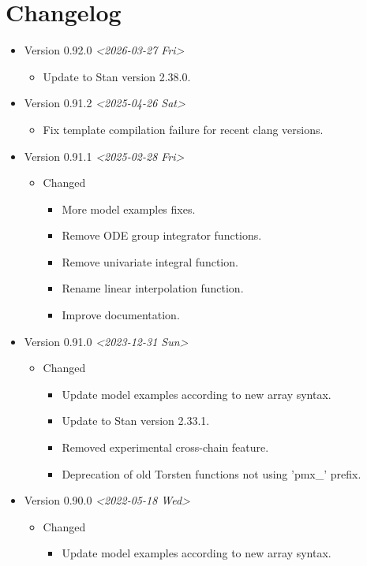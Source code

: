 \documentclass[12pt, reqno, oneside]{amsbook}
\numberwithin{equation}{chapter}
\numberwithin{figure}{chapter}
\numberwithin{table}{chapter}
\theoremstyle{remark}
\begin{document}
\chapter{Changelog}
\label{sec:org6ee814c}
\begin{itemize}
  \item Version 0.92.0 \textit{<2026-03-27 Fri>}
\begin{itemize}
\item Update to Stan version 2.38.0.
\end{itemize}
  \item Version 0.91.2 \textit{<2025-04-26 Sat>}
\begin{itemize}
\item Fix template compilation failure for recent clang versions.
\end{itemize}
  \item Version 0.91.1 \textit{<2025-02-28 Fri>}
\begin{itemize}
\item Changed
\begin{itemize}
\item More model examples fixes.
\item Remove ODE group integrator functions.
\item Remove univariate integral function.
\item Rename linear interpolation function.
\item Improve documentation.
\end{itemize}
\end{itemize}
\item Version 0.91.0 \textit{<2023-12-31 Sun>}
\begin{itemize}
\item Changed
\begin{itemize}
\item Update model examples according to new array syntax.
\item Update to Stan version 2.33.1.
\item Removed experimental cross-chain feature.
\item Deprecation of old Torsten functions not using 'pmx\_' prefix.
\end{itemize}
\end{itemize}
\item Version 0.90.0 \textit{<2022-05-18 Wed>}
\begin{itemize}
\item Changed
\begin{itemize}
\item Update model examples according to new array syntax.

\end{itemize}
\end{itemize}
\end{itemize}
\end{document}
